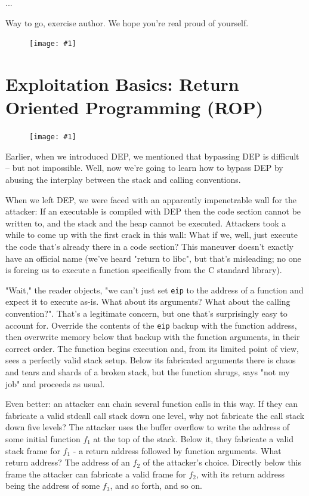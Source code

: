 \documentclass{article}
\newcommand{\displayimage}[1] {
\begin{figure}[H]
    \centering
    \texttt{[image: \#1]} 
\end{figure}
}
\newcommand{\wrapimageright}[1] {
    \begin{figure}
        \begin{center}
            \texttt{[image: \#1]} 
        \end{center}
    \end{figure}
}
\newcommand{\xcode}[2]{\colorbox{ubuntuback}{\lstinline[language=#1]|#2|}}
\newcommand{\asm}[1]{\xcode{{[x86masm]assembler}}{#1}}
\begin{document}
...

Way to go, exercise author. We hope you're real proud of yourself.

\displayimage{../19_blukat/solution.png}

\section{Exploitation Basics: Return Oriented Programming (ROP)}

\wrapimageright{./images/rop_stack_layout.png}
Earlier, when we introduced DEP, we mentioned that bypassing DEP is difficult -- but not impossible. Well, now we're going to learn how to bypass DEP by abusing the interplay between the stack and calling conventions.

When we left DEP, we were faced with an apparently impenetrable wall for the attacker: If an executable is compiled with DEP then the code section cannot be written to, and the stack and the heap cannot be executed. Attackers took a while to come up with the first crack in this wall: What if we, well, just execute the code that's already there in a code section? This maneuver doesn't exactly have an official name (we've heard "return to libc", but that's misleading; no one is forcing us to execute a function specifically from the C standard library).

"Wait," the reader objects, "we can't just set \asm{eip} to the address of a function and expect it to execute as-is. What about its arguments? What about the calling convention?". That's a legitimate concern, but one that's surprisingly easy to account for. Override the contents of the \asm{eip} backup with the function address, then overwrite memory below that backup with the function arguments, in their correct order. The function begins execution and, from its limited point of view, sees a perfectly valid stack setup. Below its fabricated arguments there is chaos and tears and shards of a broken stack, but the function shrugs, says "not my job" and proceeds as usual.

Even better: an attacker can chain several function calls in this way. If they can fabricate a valid stdcall call stack down one level, why not fabricate the call stack down five levels? The attacker uses the buffer overflow to write the address of some initial function $f_1$ at the top of the stack. Below it, they fabricate a valid stack frame for $f_1$ - a return address followed by function arguments. What return address? The address of an $f_2$ of the attacker's choice. Directly below this frame the attacker can fabricate a valid frame for $f_2$, with its return address being the address of some $f_3$, and so forth, and so on.
\end{document}
